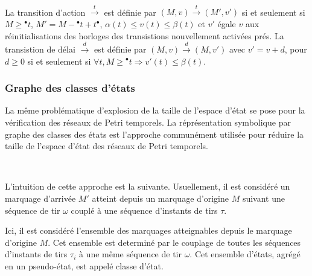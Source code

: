 \documentclass{article}
\begin{document}
        ~

        La transition d'action $\xrightarrow{t}$ est définie par $(M,v)
        \xrightarrow{t}(M',v')$ si et seulement si $M \geq {}^{\bullet}t$, $M' =
        M - {}^{\bullet}t + t{}^{\bullet}$, $\alpha(t) \leq v(t) \leq \beta(t)$
        et $v'$ égale $v$ aux réinitialisations des horloges des transistions
        nouvellement activées prés. La transistion de délai $\xrightarrow{d}$
        est définie par $(M,v) \xrightarrow{d} (M,v')$ avec $v' = v + d$, pour
        $d \geq 0$ si et seulement si $\forall t, M \geq {}^{\bullet}t
        \Rightarrow v'(t) \leq \beta (t)$.
    
      \subsubsection{Graphe des classes d'états}
      \label{sec:state-class-graph}
    
        La même problématique d'explosion de la taille de l'espace d'état se
        pose pour la vérification des réseaux de Petri temporels. La
        réprésentation symbolique par graphe des classes des états
        \cite{berthomieu91} est l'approche communément utilisée pour réduire la
        taille de l'espace d'état des réseaux de Petri temporels.
        
        ~

        L'intuition de cette approche est la suivante. Usuellement, il est
        considéré un marquage d'arrivée $M'$ atteint depuis un marquage
        d'origine $M$ suivant une séquence de tir $\omega$ couplé à une séquence
        d'instants de tirs $\tau$.

        Ici, il est considéré l'ensemble des marquages atteignables depuis le
        marquage d'origine $M$. Cet ensemble est determiné par le couplage de
        toutes les séquences d'instants de tirs $\tau_i$ à une même séquence de
        tir $\omega$. Cet ensemble d'états, agrégé en un pseudo-état, est appelé
        classe d'état.

      
        
        ~
        
\end{document}
